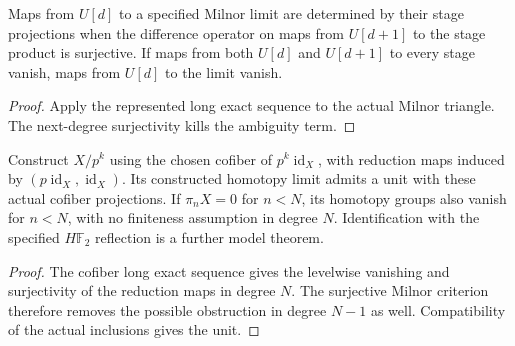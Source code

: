 \begin{proposition}
  \label{prop:milnor-represented-detection}
  \leanok
  Maps from $U[d]$ to a specified Milnor limit are determined by their
  stage projections when the difference operator on maps from $U[d+1]$
  to the stage product is surjective. If maps from both $U[d]$ and
  $U[d+1]$ to every stage vanish, maps from $U[d]$ to the limit vanish.
\end{proposition}
\begin{proof}
  Apply the represented long exact sequence to the actual Milnor
  triangle. The next-degree surjectivity kills the ambiguity term.
  \leanok
\end{proof}

\begin{proposition}
  \label{prop:moore-completion-connectivity}
  \leanok
  Construct $X/p^k$ using the chosen cofiber of $p^k\operatorname{id}_X$,
  with reduction maps induced by $(p\operatorname{id}_X,\operatorname{id}_X)$.
  Its constructed homotopy limit admits a unit with these actual cofiber
  projections. If $\pi_nX=0$ for $n<N$, its homotopy groups also vanish
  for $n<N$, with no finiteness assumption in degree $N$.
  Identification with the specified $H\mathbb F_2$ reflection is a further
  model theorem.
\end{proposition}
\begin{proof}
  The cofiber long exact sequence gives the levelwise vanishing and
  surjectivity of the reduction maps in degree $N$. The surjective
  Milnor criterion therefore removes the possible obstruction in degree
  $N-1$ as well. Compatibility of the actual inclusions gives the unit.
  \leanok
\end{proof}

